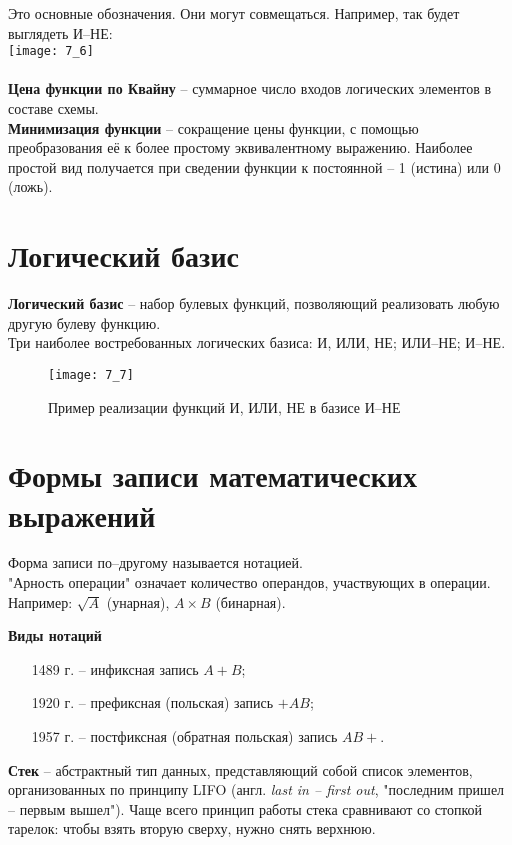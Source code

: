 Это основные обозначения. Они могут совмещаться. Например, так будет выглядеть И--НЕ:
\\\texttt{[image: 7\_6]}
\\
\\\textbf{Цена функции по Квайну} – суммарное число входов логических элементов в составе схемы.
\\\textbf{Минимизация функции} – сокращение цены функции, с помощью преобразования её к более простому эквивалентному выражению.
Наиболее простой вид получается при сведении функции к постоянной -- 1 (истина) или 0 (ложь).
\section{Логический базис}
\textbf{Логический базис} -- набор булевых функций, позволяющий реализовать любую другую булеву функцию.
\\Три наиболее востребованных логических базиса: И, ИЛИ, НЕ; ИЛИ--НЕ; И--НЕ.
\begin{figure}[!h]
\centering
\texttt{[image: 7\_7]}
\caption{Пример реализации функций И, ИЛИ, НЕ в базисе И--НЕ}
\end{figure}
\section{Формы записи математических выражений}
Форма записи по--другому называется нотацией.
\\"Арность операции" означает количество операндов, участвующих в операции.
\\Например: $\sqrt{A}$ (унарная), $A\times B$ (бинарная).
\\
\begin{center}
 \textbf{Виды нотаций}
\end{center}
\begin{itemize}
  \item[1489 г.] -- инфиксная запись $A + B$;
  \item[1920 г.] -- префиксная (польская) запись $+AB$;
  \item[1957 г.] -- постфиксная (обратная польская) запись $AB+$.
\end{itemize}
\textbf{Стек} -- абстрактный тип данных, представляющий собой список элементов, организованных по принципу LIFO (англ. \emph{last in -- first out}, "последним пришел -- первым вышел"). Чаще всего принцип работы стека сравнивают со стопкой тарелок: чтобы взять вторую сверху, нужно снять верхнюю.
